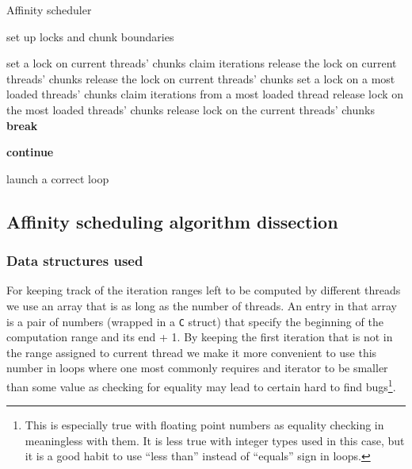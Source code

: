 \documentclass[11pt,a4paper]{article}
\begin{document}
\begin{algorithm}
    \caption{Affinity scheduler}\label{aff_src}
    \begin{algorithmic}[1]
        \State set up locks and chunk boundaries

            \State set a lock on current threads' chunks
                \State claim iterations
                \State release the lock on current threads' chunks
                \State release the lock on current threads' chunks
                \State set a lock on a most loaded threads' chunks
                \State claim iterations from a most loaded thread
                \State release lock on the most loaded threads' chunks
            \Else
                \State release lock on the current threads' chunks
                \State \textbf{break}
            \EndIf

                \State \textbf{continue}
            \EndIf

            \State launch a correct loop
        \EndWhile
    \end{algorithmic}
\end{algorithm}

\subsection{Affinity scheduling algorithm dissection}
\subsubsection{Data structures used}
For keeping track of the iteration ranges left to be computed by different threads we use an array that is as long as the number of threads. 
An entry in that array is a pair of numbers (wrapped in a \texttt{C} struct) that specify the beginning of the computation range and its end + 1. 
By keeping the first iteration that is not in the range assigned to current thread we make it more convenient to use this number in loops where one most commonly requires and iterator to be smaller than some value as checking for equality may lead to certain hard to find bugs\footnote{This is especially true with floating point numbers as equality checking in meaningless with them. It is less true with integer types used in this case, but it is a good habit to use ``less than'' instead of ``equals'' sign in loops.}.
\end{document}
